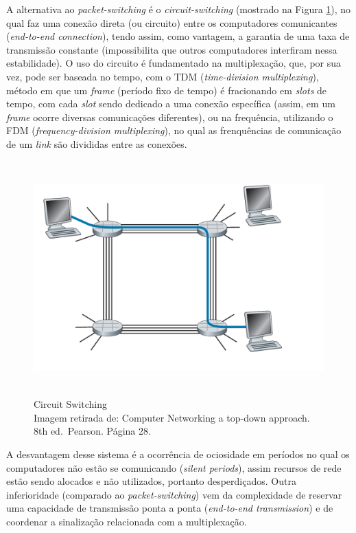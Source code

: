 A alternativa ao \emph{packet-switching} é o \emph{circuit-switching}
(mostrado na Figura \ref{Circuit Switching}), no qual faz uma conexão direta (ou circuito)
entre os computadores comunicantes (\emph{end-to-end connection}), tendo
assim, como vantagem, a garantia de uma taxa de transmissão constante
(impossibilita que outros computadores interfiram nessa estabilidade). O
uso do circuito é fundamentado na multiplexação, que, por sua vez, pode
ser baseada no tempo, com o TDM (\emph{time-division multiplexing}),
método em que um \emph{frame} (período fixo de tempo) é fracionando em
\emph{slots} de tempo, com cada \emph{slot} sendo dedicado a uma conexão
específica (assim, em um \emph{frame} ocorre diversas comunicações
diferentes), ou na frequência, utilizando o FDM
(\emph{frequency-division multiplexing}), no qual as frenquências de
comunicação de um \emph{link} são divididas entre as conexões.


\begin{figure}[H]
\centering
\includegraphics[keepaspectratio, width=12cm, height=9cm]{imagens/08/08 - circuit-switching.png}
\caption{Circuit Switching \\
Imagem retirada de: Computer Networking a top-down approach. 8th
ed.~Pearson. Página 28.\\}
\label{Circuit Switching}
\end{figure}

A desvantagem desse sistema é a ocorrência de ociosidade em períodos no
qual os computadores não estão se comunicando (\emph{silent periods}),
assim recursos de rede estão sendo alocados e não utilizados, portanto
desperdiçados. Outra inferioridade (comparado ao
\emph{packet-switching}) vem da complexidade de reservar uma capacidade
de transmissão ponta a ponta (\emph{end-to-end transmission}) e de
coordenar a sinalização relacionada com a multiplexação.


